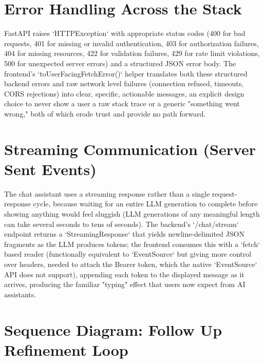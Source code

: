 \documentclass[11pt,a4paper]{report}
\begin{document}
\section{Error Handling Across the Stack}

FastAPI raises `HTTPException` with appropriate status codes (400 for bad requests, 401 for missing or invalid authentication, 403 for authorization failures, 404 for missing resources, 422 for validation failures, 429 for rate limit violations, 500 for unexpected server errors) and a structured JSON error body. The frontend's `toUserFacingFetchError()` helper translates both these structured backend errors and raw network level failures (connection refused, timeouts, CORS rejections) into clear, specific, actionable messages, an explicit design choice to never show a user a raw stack trace or a generic "something went wrong," both of which erode trust and provide no path forward.

\section{Streaming Communication (Server Sent Events)}

The chat assistant uses a streaming response rather than a single request-response cycle, because waiting for an entire LLM generation to complete before showing anything would feel sluggish (LLM generations of any meaningful length can take several seconds to tens of seconds). The backend's `/chat/stream` endpoint returns a `StreamingResponse` that yields newline-delimited JSON fragments as the LLM produces tokens; the frontend consumes this with a `fetch` based reader (functionally equivalent to `EventSource` but giving more control over headers, needed to attach the Bearer token, which the native `EventSource` API does not support), appending each token to the displayed message as it arrives, producing the familiar "typing" effect that users now expect from AI assistants.

\section{Sequence Diagram: Follow Up Refinement Loop}
\end{document}
